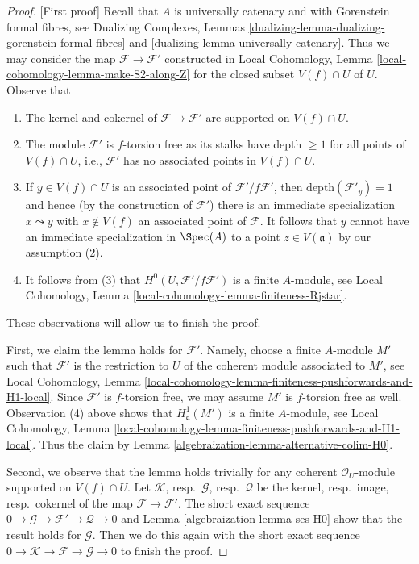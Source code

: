 \begin{proof}
[First proof]
Recall that $A$ is universally catenary and with Gorenstein
formal fibres, see Dualizing Complexes, Lemmas
\ref{dualizing-lemma-dualizing-gorenstein-formal-fibres} and
\ref{dualizing-lemma-universally-catenary}. Thus we may consider the map
$\mathcal{F} \to \mathcal{F}'$ constructed in
Local Cohomology, Lemma \ref{local-cohomology-lemma-make-S2-along-Z}
for the closed subset $V(f) \cap U$ of $U$.
Observe that
\begin{enumerate}
\item The kernel and cokernel of $\mathcal{F} \to \mathcal{F}'$
are supported on $V(f) \cap U$.
\item The module $\mathcal{F}'$ is $f$-torsion free as its stalks have
depth $\geq 1$ for all points of $V(f) \cap U$, i.e., $\mathcal{F}'$
has no associated points in $V(f) \cap U$.
\item If $y \in V(f) \cap U$ is an associated point of
$\mathcal{F}'/f\mathcal{F}'$, then
$\text{depth}(\mathcal{F}'_y) = 1$
and hence (by the construction of $\mathcal{F}'$)
there is an immediate specialization $x \leadsto y$
with $x \not \in V(f)$ an associated point of $\mathcal{F}$.
It follows that $y$ cannot have
an immediate specialization in $\Spec(A)$
to a point $z \in V(\mathfrak a)$ by our assumption (2).
\item It follows from (3) that $H^0(U, \mathcal{F}'/f\mathcal{F}')$
is a finite $A$-module, see
Local Cohomology, Lemma \ref{local-cohomology-lemma-finiteness-Rjstar}.
\end{enumerate}
These observations will allow us to finish the proof.

\medskip\noindent
First, we claim the lemma holds for $\mathcal{F}'$.
Namely, choose a finite $A$-module $M'$ such that $\mathcal{F}'$
is the restriction
to $U$ of the coherent module associated to $M'$, see Local Cohomology,
Lemma \ref{local-cohomology-lemma-finiteness-pushforwards-and-H1-local}.
Since $\mathcal{F}'$ is $f$-torsion free, we may assume $M'$
is $f$-torsion free as well. Observation (4) above shows that
$H^1_\mathfrak a(M')$ is a finite $A$-module, see Local Cohomology,
Lemma \ref{local-cohomology-lemma-finiteness-pushforwards-and-H1-local}.
Thus the claim by Lemma \ref{algebraization-lemma-alternative-colim-H0}.

\medskip\noindent
Second, we observe that the lemma holds trivially for any coherent
$\mathcal{O}_U$-module supported on $V(f) \cap U$.
Let $\mathcal{K}$, resp.\ $\mathcal{G}$, resp.\ $\mathcal{Q}$
be the kernel, resp.\ image, resp.\ cokernel of the map
$\mathcal{F} \to \mathcal{F}'$.
The short exact sequence
$0 \to \mathcal{G} \to \mathcal{F}' \to \mathcal{Q} \to 0$
and Lemma \ref{algebraization-lemma-ses-H0} show that the result holds for
$\mathcal{G}$. Then we do this again with the short exact sequence
$0 \to \mathcal{K} \to \mathcal{F} \to \mathcal{G} \to 0$
to finish the proof.
\end{proof}

